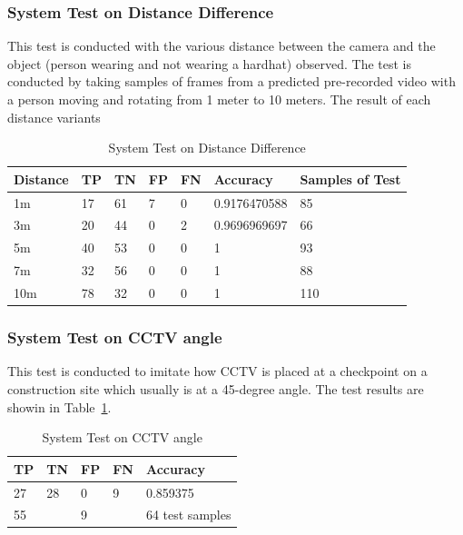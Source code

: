 \subsubsection{System Test on Distance Difference}
\label{subsubsec:hedect_test_dist}

\par This test is conducted with the various distance between the camera and the object (person wearing and not wearing a hardhat) observed. The test is conducted by taking samples of frames from a predicted pre-recorded video with a person moving and rotating from 1 meter to 10 meters. The result of each distance variants

\begin{table}
  \centering
  \caption{System Test on Distance Difference}
  \begin{tabular}{|l|l|l|l|l|l|l|} 
  \hline
  Distance & TP & TN & FP & FN & Accuracy     & Samples of Test  \\ 
  \hline
  1m       & 17 & 61 & 7  & 0  & 0.9176470588 & 85               \\ 
  \hline
  3m       & 20 & 44 & 0  & 2  & 0.9696969697 & 66               \\ 
  \hline
  5m       & 40 & 53 & 0  & 0  & 1            & 93               \\ 
  \hline
  7m       & 32 & 56 & 0  & 0  & 1            & 88               \\ 
  \hline
  10m      & 78 & 32 & 0  & 0  & 1            & 110              \\
  \hline
  \end{tabular}
\end{table}


\subsubsection{System Test on CCTV angle}
\label{subsubsec:hedect_test_cctv}

\par This test is conducted to imitate how CCTV is placed at a checkpoint on a construction site which usually is at a 45-degree angle. The test results are showin in Table~\ref{tb:systest_cctv}.

\begin{table}
  \centering
  \caption{System Test on CCTV angle}
  \label{tb:systest_cctv}
  \begin{tabular}{|l|l|l|l|l|} 
  \hline
  TP & TN & FP & FN & Accuracy         \\ 
  \hline
  27 & 28 & 0  & 9  & 0.859375         \\ 
  \hline
  \multicolumn{2}{|l|}{55}   & \multicolumn{2}{l|}{9} & 64 test samples  \\
  \hline
  \end{tabular}
\end{table}


